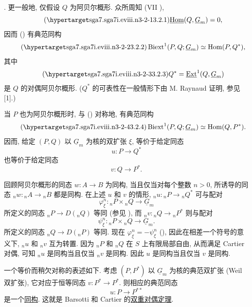 \medskip
\noindent {}. 更一般地, 仅假设 $Q$ 为阿贝尔概形. 众所周知 (VII ),
\begin{equation}\tag{\SGARefTarget{sga7.sga7i.eviii.n3-2-1}{3.2.1}}
 \uHom(Q,\underline G_m)=0,
\end{equation}
因而 () 有典范同构
\begin{equation}\tag{\SGARefTarget{sga7.sga7i.eviii.n3-2-2}{3.2.2}}
 \Biext^1(P,Q;\underline G_m)\simeq\Hom(P,Q^*),
\end{equation}
其中
\begin{equation}\tag{\SGARefTarget{sga7.sga7i.eviii.n3-2-3}{3.2.3}}
 Q^*=\uExt^1(Q,\underline G_m)
\end{equation}
是 $Q$ 的对偶阿贝尔概形. ($Q^*$ 的可表性在一般情形下由 M. Raynaud 证明, 参见 [1].)

当 $P$ 也为阿贝尔概形时, 与 () 对称地, 有典范同构
\begin{equation}\tag{\SGARefTarget{sga7.sga7i.eviii.n3-2-4}{3.2.4}}
 \Biext^1(P,Q;\underline G_m)\simeq\Hom(Q,P^*).
\end{equation}
因而, 给定 $(P,Q)$ 以 $\underline G_m$ 为核的双扩张 $\xi$, 等价于给定同态
\[
 u:P\longrightarrow Q^*
\]
也等价于给定同态
\[
 v:Q\longrightarrow P^*.
\]

回顾阿贝尔概形的同态 $w:A\longrightarrow B$ 为同构, 当且仅当对每个整数 $n>0$, 所诱导的同态 ${}_nw:{}_nA\longrightarrow{}_nB$ 都是同构. 在上述 $u$ 和 $v$ 的情形, ${}_nu:{}_nP\longrightarrow{}_nQ^*$ 可与配对
\[
 \varphi_\xi^n:{}_nP\times{}_nQ\longrightarrow\underline G_m
\]
所定义的同态 ${}_nP\longrightarrow D({}_nQ)$ 等同 (参见 ), 而 ${}_nv:{}_nQ\longrightarrow{}_nP^*$ 则与配对
\[
 \psi_\xi^n:{}_nP\times{}_nQ\longrightarrow\underline G_m.
\]
所定义的同态 ${}_nQ\longrightarrow D({}_nP)$ 等同. 现在 $\varphi_\xi^n=-\psi_\xi^n$ (), 因此在相差一个符号的意义下, ${}_nu$ 和 ${}_nv$ 互为转置. 因为 ${}_nP$ 和 ${}_nQ$ 在 $S$ 上有限局部自由, 从而满足 Cartier 对偶, 可知 ${}_nu$ 是同构当且仅当 ${}_nv$ 是同构. 因此 $u$ 是同构当且仅当 $v$ 是同构.

一个等价而稍欠对称的表述如下. 考虑 $(P,P^*)$ 以 $\underline G_m$ 为核的典范双扩张 (Weil 双扩张), 它对应于恒等同态 $v:P^*\longrightarrow P^*$. 则相应的典范同态
\[
 u:P\longrightarrow P^{**}
\]
是一个\underline{同构}. 这就是 Barsotti 和 Cartier 的\underline{双重对偶定理}.


